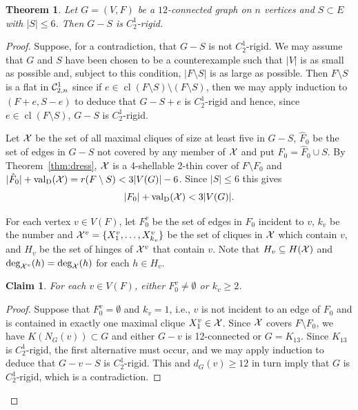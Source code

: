 \documentclass{daj}
\newtheorem{theorem}[thm]{Theorem}\theoremstyle{plain}
\newtheorem{claim}[thm]{Claim}\theoremstyle{plain}
\DeclareMathOperator{\cl}{cl}
\newcommand{\sm}{{\setminus}}
\newcommand{\valD}{{\rm val}_{\rm D}}
\begin{document}
\begin{theorem}\label{thm:12conn}
Let $G=(V,F)$ be a $12$-connected graph on $n$ vertices and $S\subset E$ with $|S|\leq 6$.
Then $G-S$ is $C_{2}^1$-rigid.
\end{theorem}
\begin{proof}
Suppose, for a contradiction, that $G-S$ is not $C_{2}^1$-rigid. We may assume that $G$ and $S$ have been chosen to be a counterexample such that $|V|$ is as small as possible and, subject to this condition, $|F\setminus S|$ is as large as possible.
Then $F\setminus S$ is a flat in ${\cal C}_{2,n}^1$ since if $e\in \cl(F\setminus S)\setminus (F\setminus S)$, then we may apply induction to $(F+e,S-e)$ to deduce that $G-S+e$ is $C_{2}^1$-rigid and hence, since $e\in \cl(F\setminus S)$, $G-S$ is  $C_{2}^1$-rigid.


Let ${\cal X}$ be the set of all maximal cliques of size at least five in $G-S$, $\hat F_0$ be the set of edges in $G-S$ not covered by any member of ${\cal X}$ and put $F_0=\hat F_0\cup S$.
By Theorem~\ref{thm:dress}, ${\cal X}$ is a 4-shellable 2-thin cover of $F\setminus  F_0$ and 
$|\hat F_0|+\valD({\cal X})=r(F\setminus S)<3|V(G)|-6$. Since $|S|\leq 6$ this gives
\begin{equation}
\label{eq:connectivity_rank}
|F_0|+\valD({\cal X})<3|V(G)|.
\end{equation}

For each vertex $v\in V(F)$, let $F_0^v$ be the set of edges in $F_0$ incident to $v$, $k_v$ be the number and ${\cal X}^v=\{X_1^v, \dots, X_{k_v}^v\}$ be the set of cliques in $\cal X$ which contain $v$, 
and 
$H_v$ be the set of hinges of ${\cal X}^v$ that contain $v$.  
Note that $H_v\subseteq H({\cal X})$ and ${\rm deg}_{{\cal X}^v}(h)={\rm deg}_{\cal X}(h)$ for each $h\in H_v$.

\begin{claim}
\label{claim:connectivity1}
For each $v\in V(F)$, either $F_0^v\neq \emptyset$ or $k_v\geq 2$.
\end{claim}
\begin{proof}
Suppose that $F_0^v=\emptyset$ and $k_v=1$, i.e., $v$ is not incident to an edge of $F_0$ and is contained in exactly one maximal clique  $X_1^v\in {\cal X}$. 
Since $\cal X$ covers $F\sm F_0$, we have $K(N_G(v))\subset G$ and  either $G-v$ is  12-connected or $G=K_{13}$.
Since $K_{13}$ is $C_2^1$-rigid, the first alternative must occur, and we may apply induction to deduce that $G-v-S$ is $C_2^1$-rigid.
This and $d_G(v)\geq 12$ in turn imply that $G$ is $C_2^1$-rigid, which is a contradiction.
\end{proof}



\end{proof}
\end{document}
